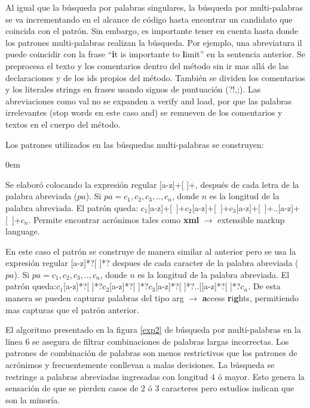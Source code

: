 \documentclass[12pt]{report}
\begin{document}
Al igual que la búsqueda por palabras singulares, la búsqueda por multi-palabras se va incrementando en el alcance de código hasta encontrar un candidato que coincida con el patrón. Sin embargo, es importante tener en cuenta hasta donde los patrones multi-palabras realizan la búsqueda. Por ejemplo, una abreviatura \textsf{il} puede coincidir con la frase “\textbf{i}t is importante to \textbf{l}imit” en la sentencia anterior. Se preprocesa el texto y los comentarios dentro del método sin ir mas allá de las declaraciones y de los ids propios del método. También se dividen los comentarios y los literales strings en frases usando signos de puntuación (?!,;). Las abreviaciones como \textsf{val} no se expanden a \textsf{verify and load}, por que las palabras irrelevantes (stop words en este caso \textsf{and}) se remueven de los comentarios y textos en el cuerpo del método.

Los patrones utilizados en las búsquedas multi-palabras se construyen:

\begin{description}
\itemsep0em%
\item[Patrón acrónimo:] Se elaboró colocando la expresión regular [a-z]+[ ]+, después de cada letra de la palabra abreviada ($pa$). Si $pa=c_{1},c_{2},c_{3},..,c_{n}$, donde $n$ es la longitud de la palabra abreviada. El patrón queda: \mbox{$c_{1}$[a-z]+[ ]+$c_{2}$[a-z]+[ ]+$c_{3}$[a-z]+[ ]+..[a-z]+[ ]+$c_{n}$}. Permite encontrar acrónimos tales como \textbf{xml} $\rightarrow$ extensible markup language.

\item[Patrón de Combinación de Palabras:] En este caso el patrón se construye de manera similar al anterior pero se usa la expresión regular [a-z]*?[ ]*? despues de cada caracter de la palabra abreviada ($pa$). Si $pa=c_{1},c_{2},c_{3},..,c_{n}$, donde $n$ es la longitud de la palabra abreviada. El patrón queda:$c_{1}$[a-z]*?[ ]*?$c_{2}$[a-z]*?[ ]*?$c_{3}$[a-z]*?[ ]*?..[[a-z]*?[ ]*?$c_{n}$. De esta manera se pueden capturar palabras del tipo \textsf{arg} $\rightarrow$ \textbf{a}ccess \textbf{r}i\textbf{g}hts, permitiendo mas capturas que el patrón anterior.
\end{description}


El algoritmo presentado en la figura \ref{exp2} de búsqueda por multi-palabras\cite{EZH08} en la línea 6 se asegura de filtrar combinaciones de palabras largas incorrectas. Los patrones de combinación de palabras son menos restrictivos que los patrones de acrónimos y frecuentemente conllevan a malas decisiones. La búsqueda se restringe a palabras abreviadas ingresadas con longitud 4 ó mayor. Esto genera la sensación de que se pierden casos de 2 ó 3 caracteres pero estudios indican que son la minoría\cite{EZH08}.
 
\end{document}
